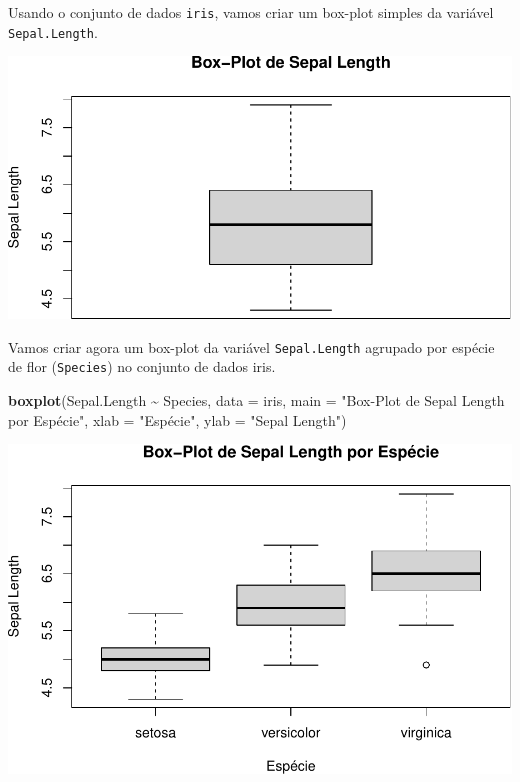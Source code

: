 \documentclass[
]{book}
\newenvironment{Shaded}{\begin{snugshade}}{\end{snugshade}}
\newcommand{\AttributeTok}[1]{\textcolor[rgb]{0.13,0.29,0.53}{#1}}
\newcommand{\FunctionTok}[1]{\textcolor[rgb]{0.13,0.29,0.53}{\textbf{#1}}}
\newcommand{\NormalTok}[1]{#1}
\newcommand{\SpecialCharTok}[1]{\textcolor[rgb]{0.81,0.36,0.00}{\textbf{#1}}}
\newcommand{\StringTok}[1]{\textcolor[rgb]{0.31,0.60,0.02}{#1}}
\begin{document}
Usando o conjunto de dados \texttt{iris}, vamos criar um box-plot simples da
variável \texttt{Sepal.Length}.

\begin{Shaded}
\end{Shaded}

\includegraphics{introR_files/figure-latex/unnamed-chunk-179-1.pdf}

Vamos criar agora um box-plot da variável \texttt{Sepal.Length} agrupado por
espécie de flor (\texttt{Species}) no conjunto de dados iris.

\begin{Shaded}
\begin{Highlighting}[]
\FunctionTok{boxplot}\NormalTok{(Sepal.Length }\SpecialCharTok{\textasciitilde{}}\NormalTok{ Species, }
        \AttributeTok{data =}\NormalTok{ iris, }
        \AttributeTok{main =} \StringTok{"Box{-}Plot de Sepal Length por Espécie"}\NormalTok{, }
        \AttributeTok{xlab =} \StringTok{"Espécie"}\NormalTok{, }
        \AttributeTok{ylab =} \StringTok{"Sepal Length"}\NormalTok{)}
\end{Highlighting}
\end{Shaded}

\includegraphics{introR_files/figure-latex/unnamed-chunk-180-1.pdf}
\end{document}
